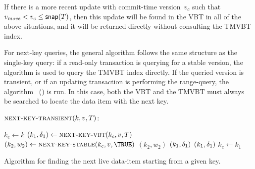 If there is a more recent update with commit-time version~$v_c$ such that 
$\smash{v_{\text{\textit{move}}}} < v_c \leq \text{\textsf{snap}}(T)$, then this update will be found
in the VBT in all of the above situations, and it will be
returned directly without consulting the TMVBT index.

For next-key queries, the general algorithm follows the same structure as the
single-key query: if a read-only transaction is querying for a stable version,
the algorithm  is used to query the TMVBT index directly. 
If the queried version is transient, or if an updating transaction is
performing the range-query, the algorithm~
() is run.
In this case, both the VBT and the TMVBT must always be searched to locate 
the data item with the next key.

\begin{algorithm}[!htb]
$\proc{next-key-transient}(k, v, T)$:

\begin{algorithmic}[1]
\STATE $k_c \gets k$ 
\label{alg:next-query:init-keys}
\LOOP 
  \STATE $(k_1, \updatemark_1) \gets \proc{next-key-VBT}(k_c, v,
  T)$ 
  \STATE $(k_2, w_2) \gets \proc{next-key-stable}(k_c, v,
  \TRUE)$
  \label{alg:next-query:next-in-tmvbt}
    \RETURN $(k_2, w_2)$
  \label{alg:next-query:next-in-vbt}
      \RETURN $(k_1, \delta_1)$
    \ENDIF
  \label{alg:next-query:next-in-both}
      \RETURN \nullmark
      \RETURN $(k_1, \delta_1)$
    \ENDIF
  \ENDIF
  \STATE $k_c \gets k_1$
\ENDLOOP
\end{algorithmic}
\caption{Algorithm for finding the next live data-item starting from a
given key.}
\label{alg:next-query}
\end{algorithm}

